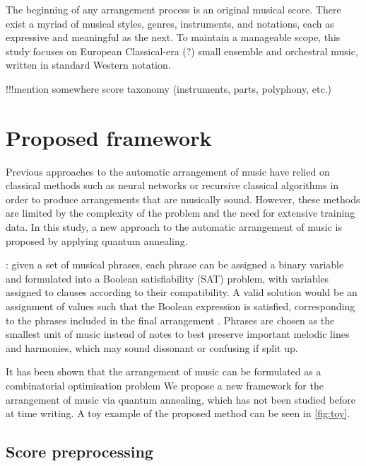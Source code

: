 \documentclass[12pt]{article}
\theoremstyle{definition}
\begin{document}
The beginning of any arrangement process is an original musical score. There exist a myriad of musical styles, genres, instruments, and notations, each as expressive and meaningful as the next. To maintain a manageable scope, this study focuses on European Classical-era (?) small ensemble and orchestral music, written in standard Western notation.

!!!mention somewhere score taxonomy (instruments, parts, polyphony, etc.)

\section{Proposed framework}

Previous approaches to the automatic arrangement of music have relied on classical methods such as neural networks  or recursive classical algorithms in order to produce arrangements that are musically sound. However, these methods are limited by the complexity of the problem and the need for extensive training data. In this study, a new approach to the automatic arrangement of music is proposed by applying quantum annealing.

: given a set of musical phrases, each phrase can be assigned a binary variable and formulated into a Boolean satisfiability (SAT) problem, with variables assigned to clauses according to their compatibility. A valid solution would be an assignment of values such that the Boolean expression is satisfied, corresponding to the phrases included in the final arrangement . Phrases are chosen as the smallest unit of music instead of notes to best preserve important melodic lines and harmonies, which may sound dissonant or confusing if split up.

It has been shown that the arrangement of music can be formulated as a combinatorial optimisation problem \cite{moses_computational_2016}
We propose a new framework for the arrangement of music via quantum annealing, which has not been studied before at time writing. A toy example of the proposed method can be seen in \cref{fig:toy}.

\subsection{Score preprocessing}
\end{document}
